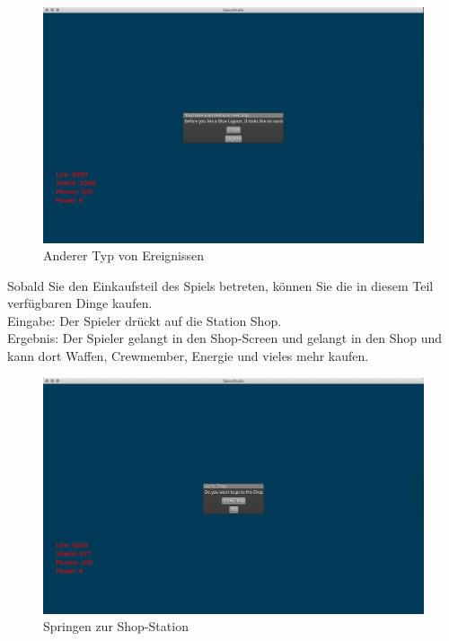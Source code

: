 \documentclass[12pt]{article}
\begin{document}
\begin{figure}[htp]
\centering
\includegraphics[scale=0.4]{TestProtocolBilder/otherEreignisse.jpg}
\caption{Anderer Typ von Ereignissen}
\end{figure}
Sobald Sie den Einkaufsteil des Spiels betreten, können Sie die in diesem Teil verfügbaren Dinge kaufen.\\
Eingabe: Der Spieler drückt auf die Station Shop.\\
Ergebnis: Der Spieler gelangt in den Shop-Screen und gelangt in den Shop und kann dort Waffen, Crewmember, Energie und vieles mehr kaufen.
\begin{figure}[htp]
\centering
\includegraphics[scale=0.4]{TestProtocolBilder/shopPlanetJump.jpg}
\caption{Springen zur Shop-Station}
\end{figure}
\newpage
\end{document}
